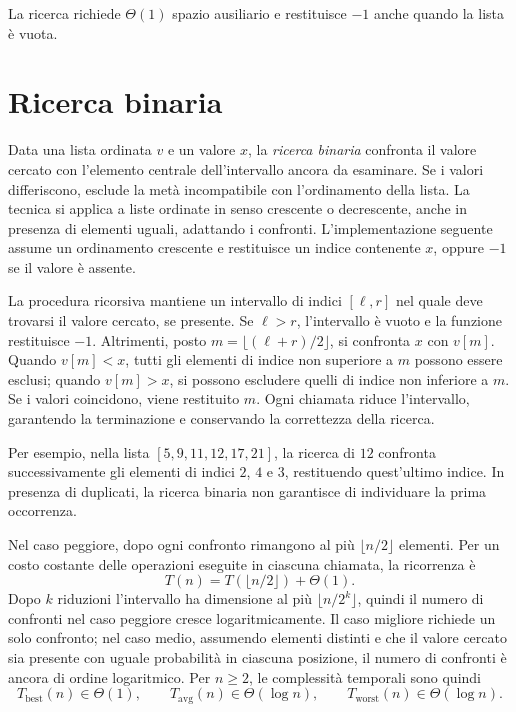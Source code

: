 La ricerca richiede \(\Theta(1)\) spazio ausiliario e restituisce
\(-1\) anche quando la lista è vuota.

\section{Ricerca binaria}
\label{sec:fi-ricerca-binaria}

Data una lista ordinata \(v\) e un valore \(x\), la
\emph{ricerca binaria} confronta il valore cercato con l'elemento
centrale dell'intervallo ancora da esaminare. Se i valori differiscono,
esclude la metà incompatibile con l'ordinamento della lista.
La tecnica si applica a liste ordinate in senso crescente o decrescente,
anche in presenza di elementi uguali, adattando i confronti.
L'implementazione seguente assume un ordinamento crescente
e restituisce un indice contenente \(x\), oppure \(-1\) se il valore
è assente.

\clearpage



La procedura ricorsiva mantiene un intervallo di indici
\([\ell,r]\) nel quale deve trovarsi il valore cercato, se presente.
Se \(\ell>r\), l'intervallo è vuoto e la funzione restituisce
\(-1\). Altrimenti, posto \(m=\lfloor(\ell+r)/2\rfloor\),
si confronta \(x\) con \(v[m]\). Quando \(v[m]<x\), tutti gli elementi
di indice non superiore a \(m\) possono essere esclusi; quando
\(v[m]>x\), si possono escludere quelli di indice non inferiore
a \(m\). Se i valori coincidono, viene restituito \(m\).
Ogni chiamata riduce l'intervallo, garantendo la terminazione
e conservando la correttezza della ricerca.

Per esempio, nella lista \([5,9,11,12,17,21]\), la ricerca di
\(12\) confronta successivamente gli elementi di indici \(2\), \(4\)
e \(3\), restituendo quest'ultimo indice. In presenza di duplicati,
la ricerca binaria non garantisce di individuare la prima occorrenza.

Nel caso peggiore, dopo ogni confronto rimangono al più
\(\lfloor n/2\rfloor\) elementi. Per un costo costante delle
operazioni eseguite in ciascuna chiamata, la ricorrenza è
\[
  T(n)=T(\lfloor n/2\rfloor)+\Theta(1).
\]
Dopo \(k\) riduzioni l'intervallo ha dimensione al più
\(\lfloor n/2^k\rfloor\), quindi il numero di confronti nel caso
peggiore cresce logaritmicamente. Il caso migliore richiede un
solo confronto; nel caso medio, assumendo elementi distinti e
che il valore cercato sia presente con uguale probabilità in
ciascuna posizione, il numero di confronti è ancora di ordine
logaritmico. Per \(n\ge2\), le complessità temporali sono quindi
\[
  T_{\mathrm{best}}(n)\in\Theta(1),\qquad
  T_{\mathrm{avg}}(n)\in\Theta(\log n),\qquad
  T_{\mathrm{worst}}(n)\in\Theta(\log n).
\]

